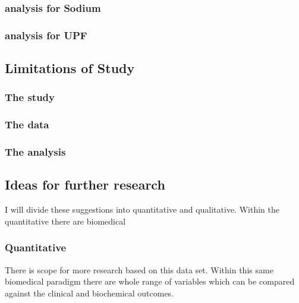 \documentclass[
]{article}
\begin{document}
\hypertarget{analysis-for-sodium}{%
\subsubsection{analysis for Sodium}\label{analysis-for-sodium}}

\hypertarget{analysis-for-upf}{%
\subsubsection{analysis for UPF}\label{analysis-for-upf}}

\hypertarget{limitations-of-study}{%
\subsection{Limitations of Study}\label{limitations-of-study}}

\hypertarget{the-study}{%
\subsubsection{The study}\label{the-study}}

\hypertarget{the-data}{%
\subsubsection{The data}\label{the-data}}

\hypertarget{the-analysis}{%
\subsubsection{The analysis}\label{the-analysis}}

\hypertarget{ideas-for-further-research}{%
\subsection{Ideas for further
research}\label{ideas-for-further-research}}

I will divide these suggestions into quantitative and qualitative.
Within the quantitative there are biomedical

\hypertarget{quantitative}{%
\subsubsection{Quantitative}\label{quantitative}}

There is scope for more research based on this data set. Within this
same biomedical paradigm there are whole range of variables which can be
compared against the clinical and biochemical outcomes.
\end{document}
